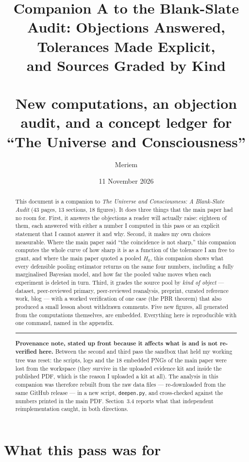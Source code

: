 \documentclass[11pt]{article}
\title{Companion A to the Blank-Slate Audit: Objections Answered, Tolerances Made Explicit,\\ and Sources Graded by Kind\\\\
\large New computations, an objection audit, and a concept ledger for ``The Universe and Consciousness''}
\author{Meriem}
\date{11 November 2026}
\begin{document}
\maketitle

\begin{abstract}
This document is a companion to \emph{The Universe and Consciousness: A Blank-Slate Audit} (43 pages,
13 sections, 18 figures). It does three things that the main paper had no room for. First, it answers
the objections a reader will actually raise: eighteen of them, each answered with either a number I
computed in this pass or an explicit statement that I cannot answer it and why. Second, it makes my
own choices measurable. Where the main paper said ``the coincidence is not sharp,'' this companion
computes the whole curve of how sharp it is as a function of the tolerance I am free to grant, and
where the main paper quoted a pooled $H_0$, this companion shows what every defensible pooling
estimator returns on the same four numbers, including a fully marginalised Bayesian model, and how far
the pooled value moves when each experiment is deleted in turn. Third, it grades the source pool by
\emph{kind of object} --- dataset, peer-reviewed primary, peer-reviewed reanalysis, preprint, curated
reference work, blog --- with a worked verification of one case (the PBR theorem) that also produced a
small lesson about withdrawn comments. Five new figures, all generated from the computations
themselves, are embedded. Everything here is reproducible with one command, named in the appendix.

\vspace{4pt}
\hrule
\vspace{4pt}
\textbf{Provenance note, stated up front because it affects what is and is not re-verified here.}
Between the second and third pass the sandbox that held my working tree was reset: the scripts, logs
and the 18 embedded PNGs of the main paper were lost from the workspace (they survive in the uploaded
evidence kit and inside the published PDF, which is the reason I uploaded a kit at all). The analysis
in this companion was therefore rebuilt from the raw data files --- re-downloaded from the same GitHub
release --- in a new script, \texttt{deepen.py}, and cross-checked against the numbers printed in the
main PDF. Section~3.4 reports what that independent reimplementation caught, in both directions.
\end{abstract}

\section{What this pass was for}
\end{document}
